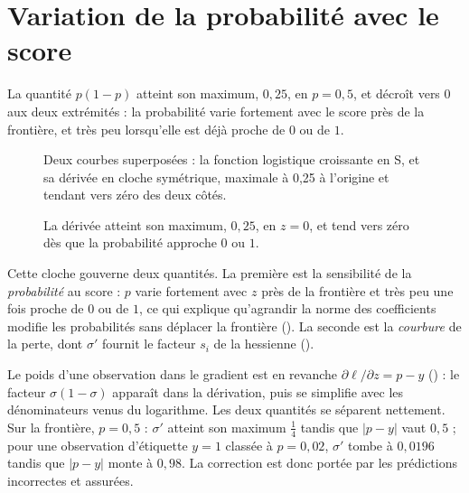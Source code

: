 \section{Variation de la probabilité avec le score}

La quantité $p(1-p)$ atteint son maximum, $0{,}25$, en $p=0{,}5$, et décroît vers
$0$ aux deux extrémités : la probabilité varie fortement avec le score près de la
frontière, et très peu lorsqu'elle est déjà proche de $0$ ou de $1$.

\begin{figure}[htbp]
\centering
\begin{graphique}{Deux courbes superposées : la fonction logistique croissante en S, et sa dérivée en cloche symétrique, maximale à 0,25 à l'origine et tendant vers zéro des deux côtés.}
\end{graphique}
\caption{La dérivée atteint son maximum, $0{,}25$, en $z=0$, et tend vers zéro dès
que la probabilité approche $0$ ou $1$.}
\label{fig:derivee-sigmoide}
\end{figure}
\FloatBarrier

Cette cloche gouverne deux quantités. La première est la sensibilité de la
\emph{probabilité} au score : $p$ varie fortement avec $z$ près de la frontière
et très peu une fois proche de $0$ ou de $1$, ce qui explique qu'agrandir la
norme des coefficients modifie les probabilités sans déplacer la frontière
(). La seconde est la \emph{courbure} de la perte, dont
$\sigma'$ fournit le facteur $s_i$ de la hessienne
().

Le poids d'une observation dans le gradient est en revanche
$\partial\ell/\partial z=p-y$ () : le facteur
$\sigma(1-\sigma)$ apparaît dans la dérivation, puis se simplifie avec les
dénominateurs venus du logarithme. Les deux quantités se séparent nettement. Sur
la frontière, $p=0{,}5$ : $\sigma'$ atteint son maximum $\frac14$ tandis que
$|p-y|$ vaut $0{,}5$ ; pour une observation d'étiquette $y=1$ classée à
$p=0{,}02$, $\sigma'$ tombe à $0{,}0196$ tandis que $|p-y|$ monte à $0{,}98$. La
correction est donc portée par les prédictions incorrectes et assurées.
